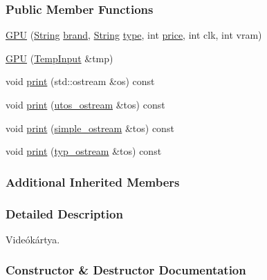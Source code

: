 \subsubsection*{Public Member Functions}
\begin{DoxyCompactItemize}
\item 
\mbox{\hyperlink{class_g_p_u_a358f512b1583399e68f76248bb305e61}{G\+PU}} (\mbox{\hyperlink{class_string}{String}} \mbox{\hyperlink{class_part_ae06f2fdeb7fbbdb229a7aca151f3e341}{brand}}, \mbox{\hyperlink{class_string}{String}} \mbox{\hyperlink{class_part_a101dbcc5c4b21564df7414c7eb0eae88}{type}}, int \mbox{\hyperlink{class_part_a8e71223aed1da95a974f33d8d6c91bb1}{price}}, int clk, int vram)
\item 
\mbox{\hyperlink{class_g_p_u_a9b1632e965c26051ae583c9b5e1c2e3c}{G\+PU}} (\mbox{\hyperlink{struct_temp_input}{Temp\+Input}} \&tmp)
\item 
void \mbox{\hyperlink{class_g_p_u_abfa2a8fa30047e9759080d724e4b3820}{print}} (std\+::ostream \&os) const
\item 
void \mbox{\hyperlink{class_g_p_u_acfa9ab35cdf1c25c324fc39c6ffc2412}{print}} (\mbox{\hyperlink{structutos__ostream}{utos\+\_\+ostream}} \&tos) const
\item 
void \mbox{\hyperlink{class_g_p_u_a27cb964d5ce05efa75cb65d836b922e1}{print}} (\mbox{\hyperlink{structsimple__ostream}{simple\+\_\+ostream}} \&tos) const
\item 
void \mbox{\hyperlink{class_g_p_u_ad54f6d21007e216f27dc738aea2de836}{print}} (\mbox{\hyperlink{structtyp__ostream}{typ\+\_\+ostream}} \&tos) const
\end{DoxyCompactItemize}
\subsubsection*{Additional Inherited Members}


\subsubsection{Detailed Description}
Videókártya. 

\subsubsection{Constructor \& Destructor Documentation}
\mbox{\label{class_g_p_u_a358f512b1583399e68f76248bb305e61}} 
